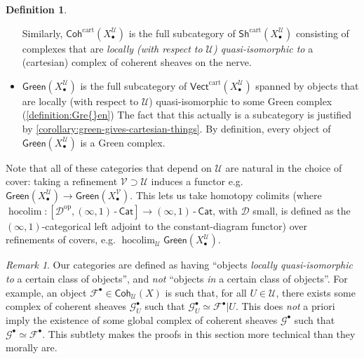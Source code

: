 \documentclass[11pt,fleqn]{article}
\theoremstyle{plain}
\theoremstyle{definition}
\newtheorem{definition}[theorem]{Definition}
\theoremstyle{remark}
\newtheorem{remark}[theorem]{Remark}
\numberwithin{equation}{theorem}
\newcommand{\cover}{\mathcal{U}}
\newcommand{\anothercover}{\mathcal{V}}
\newcommand{\restricted}{\mathbin{\big\vert}}
\newcommand{\infcat}{(\infty,1)\,\text{-}\,\mathsf{Cat}}
\newcommand{\gcohUX}{\mathsf{Coh}_{\cover}(X)}
\newcommand{\gccohX}{\mathsf{CCoh}(X)}
\newcommand{\cartvectX}{\mathsf{Vect}^\mathrm{cart}(X_\bullet^\cover)}
\newcommand{\cartcohX}{\mathsf{Coh}^\mathrm{cart}(X_\bullet^\cover)}
\newcommand{\cartshX}{\mathsf{Sh}^\mathrm{cart}(X_\bullet^\cover)}
\newcommand{\greenX}{\mathsf{Green}(X_\bullet^\cover)}
\newcommand{\greenVX}{\mathsf{Green}(X_\bullet^\anothercover)}
\DeclareMathOperator{\hocolim}{hocolim}
\begin{document}
\begin{definition}
\begin{itemize}
                    Similarly, $\cartcohX$ is the full subcategory of $\cartshX$ consisting of complexes that are \emph{locally (with respect to $\cover$) quasi-isomorphic to} a (cartesian) complex of coherent sheaves on the nerve.
                \item $\greenX$ is the full subcategory of $\cartvectX$ spanned by objects that are locally (with respect to $\cover$) quasi-isomorphic to some Green complex (\cref{definition:Gre{}en})
                    The fact that this actually is a subcategory is justified by \cref{corollary:green-gives-cartesian-things}.
                    By definition, every object of $\greenX$ is a Gre{}en complex.
            \end{itemize}

            Note that all of these categories that depend on $\cover$ are natural in the choice of cover: taking a refinement $\anothercover\supset\cover$ induces a functor e.g. $\greenX\to\greenVX$.
            This lets us take homotopy colimits (where $\hocolim\colon[\mathcal{D}^\mathrm{op},\infcat]\to\infcat$, with $\mathcal{D}$ small, is defined as the $(\infty,1)$-categorical left adjoint to the constant-diagram functor) over refinements of covers, e.g. $\hocolim_\cover\greenX$.
        \end{definition}

        \begin{remark}\label{remark:subcats-are-locally-q-iso-to}
            Our categories are defined as having ``objects \emph{locally quasi-isomorphic to} a certain class of objects'', and \emph{not} ``objects \emph{in} a certain class of objects''.
            For example, an object $\mathscr{F}^\bullet\in\gcohUX$ is such that, for all $U\in\cover$, there exists some complex of coherent sheaves $\mathscr{G}_U^\bullet$ such that $\mathscr{G}_U^\bullet\simeq \mathscr{F}^\bullet\restricted U$.
            This does \emph{not} a priori imply the existence of some global complex of coherent sheaves $\mathscr{G}^\bullet$ such that $\mathscr{G}^\bullet\simeq\mathscr{F}^\bullet$.
            This subtlety makes the proofs in this section more technical than they morally are.
        \end{remark}
\end{document}
